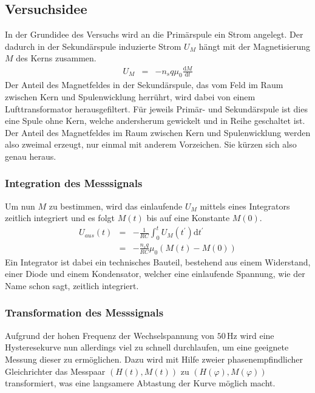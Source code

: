 \documentclass[12pt,a4paper]{scrartcl}
\numberwithin{equation}{section} %
\renewcommand{\[}{} %
\renewcommand{\]}{\noindent} %
\begin{document}
\hypertarget{versuchsidee}{%
\subsection{Versuchsidee}\label{versuchsidee}}
In der Grundidee des Versuchs wird an die Primärspule ein Strom angelegt. Der dadurch in der Sekundärspule induzierte Strom \(U_M\) hängt mit der Magnetisierung \(M\) des Kerns zusammen.
\begin{eqnarray}
    U_M &=& -n_s q \mu_0 \frac{\mathrm dM}{\mathrm dt}
\end{eqnarray}
Der Anteil des Magnetfeldes in der Sekundärspule, das vom Feld im Raum zwischen Kern und Spulenwicklung herrührt, wird dabei von einem Lufttransformator herausgefiltert. Für jeweils Primär- und Sekundärspule ist dies eine Spule ohne Kern, welche andersherum gewickelt und in Reihe geschaltet ist. Der Anteil des Magnetfeldes im Raum zwischen Kern und Spulenwicklung werden also zweimal erzeugt, nur einmal mit anderem Vorzeichen. Sie kürzen sich also genau heraus.

\hypertarget{integration-des-messsignals}{%
\subsubsection{Integration des Messsignals}\label{integration-des-messsignals}}
Um nun \(M\) zu bestimmen, wird das einlaufende \(U_M\) mittels eines Integrators zeitlich integriert und es folgt \(M(t)\) bis auf eine Konstante \(M(0)\). 
\begin{eqnarray}
    U_{aus}(t)
        &=& -\frac{1}{R C} \int_{0}^{t} U_M(t^{\prime}) \mathrm dt^{\prime} \\
        &=& -\frac{n_s q}{R C} \mu_0 (M(t) - M(0))
\end{eqnarray}
Ein Integrator ist dabei ein technisches Bauteil, bestehend aus einem Widerstand, einer Diode und einem Kondensator, welcher eine einlaufende Spannung, wie der Name schon sagt, zeitlich integriert. 

\hypertarget{transformation-des-messsignals}{%
\subsubsection{Transformation des Messsignals}\label{transformation-des-messsignals}}
Aufgrund der hohen Frequenz der Wechselspannung von \(50\,\mathrm{Hz}\) wird eine Hysteresekurve nun allerdings viel zu schnell durchlaufen, um eine geeignete Messung dieser zu ermöglichen. Dazu wird mit Hilfe zweier phasenempfindlicher Gleichrichter das Messpaar \((H(t), M(t))\) zu \((H(\varphi), M(\varphi))\) transformiert, was eine langsamere Abtastung der Kurve möglich macht.
\end{document}
